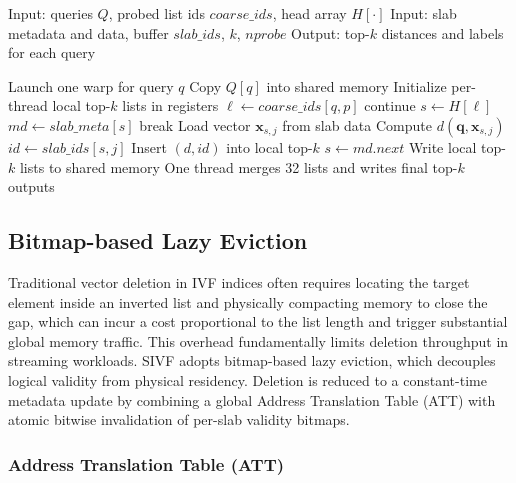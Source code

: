 \documentclass[sigconf,nonacm]{acmart}
\theoremstyle{plain}
\theoremstyle{definition}
\theoremstyle{remark}
\begin{document}
\begin{algorithm}[t]
\caption{Warp-cooperative search in SIVF}
\label{alg:sivf_search}
\begin{algorithmic}[1]
\State Input: queries $Q$, probed list ids $coarse\_ids$, head array $H[\cdot]$
\State Input: slab metadata and data, buffer $slab\_ids$, $k$, $nprobe$
\State Output: top-$k$ distances and labels for each query

    \State Launch one warp for query $q$
    \State Copy $Q[q]$ into shared memory
    \State Initialize per-thread local top-$k$ lists in registers
        \State $\ell \gets coarse\_ids[q,p]$
         \State continue \EndIf
        \State $s \gets H[\ell]$
            \State $md \gets slab\_meta[s]$
             \State break \EndIf
                \State Load vector $\mathbf{x}_{s,j}$ from slab data
                \State Compute $d(\mathbf{q}, \mathbf{x}_{s,j})$
                \State $id \gets slab\_ids[s,j]$
                \State Insert $(d,id)$ into local top-$k$
            \EndIf
            \State $s \gets md.next$
        \EndWhile
    \EndFor
    \State Write local top-$k$ lists to shared memory
    \State One thread merges 32 lists and writes final top-$k$ outputs
\EndFor
\end{algorithmic}
\end{algorithm}

\subsection{Bitmap-based Lazy Eviction}
\label{sec:bitmap_lazy_eviction}

Traditional vector deletion in IVF indices often requires locating the target element inside an inverted list and physically compacting memory to close the gap, which can incur a cost proportional to the list length and trigger substantial global memory traffic. This overhead fundamentally limits deletion throughput in streaming workloads. SIVF adopts bitmap-based lazy eviction, which decouples logical validity from physical residency. Deletion is reduced to a constant-time metadata update by combining a global Address Translation Table (ATT) with atomic bitwise invalidation of per-slab validity bitmaps.

\subsubsection{Address Translation Table (ATT)}
\end{document}
